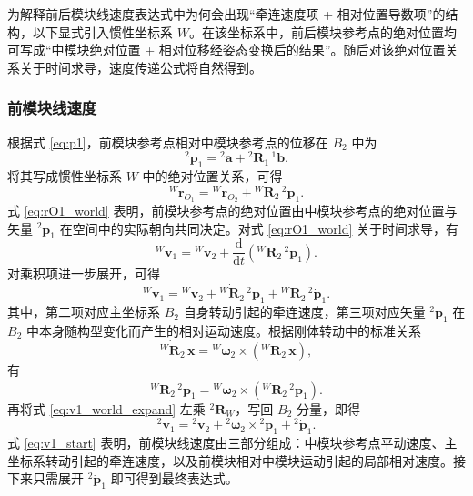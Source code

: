 为解释前后模块线速度表达式中为何会出现“牵连速度项 + 相对位置导数项”的结构，以下显式引入惯性坐标系 ${W}$。在该坐标系中，前后模块参考点的绝对位置均可写成“中模块绝对位置 + 相对位移经姿态变换后的结果”。随后对该绝对位置关系关于时间求导，速度传递公式将自然得到。

\subsubsection{前模块线速度}

根据式 \eqref{eq:p1}，前模块参考点相对中模块参考点的位移在 ${B_2}$ 中为
\begin{equation}
{}^{2}\mathbf p_1
=
{}^{2}\mathbf a+{}^{2}\mathbf R_1\,{}^{1}\mathbf b.
\end{equation}
将其写成惯性坐标系 ${W}$ 中的绝对位置关系，可得
\begin{equation}
{}^{W}\mathbf r_{O_1}
=
{}^{W}\mathbf r_{O_2}
+
{}^{W}\mathbf R_2\,{}^{2}\mathbf p_1.
\label{eq:rO1_world}
\end{equation}
式 \eqref{eq:rO1_world} 表明，前模块参考点的绝对位置由中模块参考点的绝对位置与矢量 ${}^{2}\mathbf p_1$ 在空间中的实际朝向共同决定。对式 \eqref{eq:rO1_world} 关于时间求导，有
\begin{equation}
{}^{W}\mathbf v_1
=
{}^{W}\mathbf v_2
+
\frac{\mathrm d}{\mathrm dt}\left({}^{W}\mathbf R_2\,{}^{2}\mathbf p_1\right).
\label{eq:v1_world_start}
\end{equation}
对乘积项进一步展开，可得
\begin{equation}
{}^{W}\mathbf v_1
=
{}^{W}\mathbf v_2
+
\dot{{}^{W}\mathbf R_2}\,{}^{2}\mathbf p_1
+
{}^{W}\mathbf R_2\,{}^{2}\dot{\mathbf p}_1.
\label{eq:v1_world_expand}
\end{equation}
其中，第二项对应主坐标系 ${B_2}$ 自身转动引起的牵连速度，第三项对应矢量 ${}^{2}\mathbf p_1$ 在 ${B_2}$ 中本身随构型变化而产生的相对运动速度。根据刚体转动中的标准关系
\begin{equation}
\dot{{}^{W}\mathbf R_2}\,\mathbf x
=
{}^{W}\boldsymbol\omega_2\times\left({}^{W}\mathbf R_2\,\mathbf x\right),
\end{equation}
有
\begin{equation}
\dot{{}^{W}\mathbf R_2}\,{}^{2}\mathbf p_1
=
{}^{W}\boldsymbol\omega_2\times\left({}^{W}\mathbf R_2\,{}^{2}\mathbf p_1\right).
\end{equation}
再将式 \eqref{eq:v1_world_expand} 左乘 ${}^{2}\mathbf R_W$，写回 ${B_2}$ 分量，即得
\begin{equation}
{}^{2}\mathbf v_1
=
{}^{2}\mathbf v_2
+
{}^{2}\boldsymbol\omega_2\times {}^{2}\mathbf p_1
+
{}^{2}\dot{\mathbf p}_1.
\label{eq:v1_start}
\end{equation}
式 \eqref{eq:v1_start} 表明，前模块线速度由三部分组成：中模块参考点平动速度、主坐标系转动引起的牵连速度，以及前模块相对中模块运动引起的局部相对速度。接下来只需展开 ${}^{2}\dot{\mathbf p}_1$ 即可得到最终表达式。

